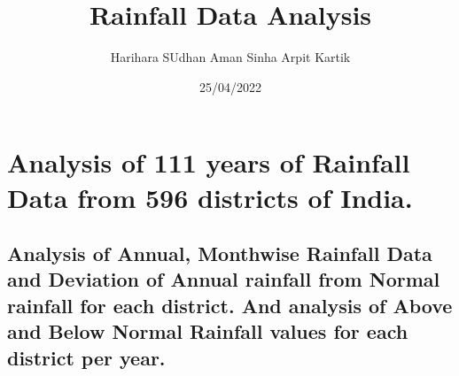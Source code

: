 \documentclass[
]{article}
\title{Rainfall Data Analysis}
\author{Harihara SUdhan Aman Sinha Arpit Kartik}
\date{25/04/2022}
\begin{document}
\maketitle

\hypertarget{analysis-of-111-years-of-rainfall-data-from-596-districts-of-india.}{%
\section{Analysis of 111 years of Rainfall Data from 596 districts of
India.}\label{analysis-of-111-years-of-rainfall-data-from-596-districts-of-india.}}

\hypertarget{analysis-of-annual-monthwise-rainfall-data-and-deviation-of-annual-rainfall-from-normal-rainfall-for-each-district.-and-analysis-of-above-and-below-normal-rainfall-values-for-each-district-per-year.}{%
\subsection{Analysis of Annual, Monthwise Rainfall Data and Deviation of
Annual rainfall from Normal rainfall for each district. And analysis of
Above and Below Normal Rainfall values for each district per
year.}\label{analysis-of-annual-monthwise-rainfall-data-and-deviation-of-annual-rainfall-from-normal-rainfall-for-each-district.-and-analysis-of-above-and-below-normal-rainfall-values-for-each-district-per-year.}}
\end{document}
